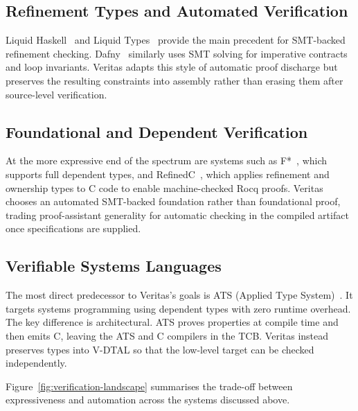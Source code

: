 \subsection{Refinement Types and Automated Verification}
Liquid Haskell~\cite{Vazou2014Refinement} and Liquid Types~\cite{Rondon2008Liquid} provide the main precedent for SMT-backed refinement checking. Dafny~\cite{Leino2010Dafny} similarly uses SMT solving for imperative contracts and loop invariants. Veritas adapts this style of automatic proof discharge but preserves the resulting constraints into assembly rather than erasing them after source-level verification.

\subsection{Foundational and Dependent Verification}
At the more expressive end of the spectrum are systems such as F*~\cite{Swamy2016Dependent}, which supports full dependent types, and RefinedC~\cite{Sammler2021RefinedC}, which applies refinement and ownership types to C code to enable machine-checked Rocq proofs. Veritas chooses an automated SMT-backed foundation rather than foundational proof, trading proof-assistant generality for automatic checking in the compiled artifact once specifications are supplied.

\subsection{Verifiable Systems Languages}
The most direct predecessor to Veritas's goals is ATS (Applied Type System)~\cite{Xi2003Applied}. It targets systems programming using dependent types with zero runtime overhead. The key difference is architectural. ATS proves properties at compile time and then emits C, leaving the ATS and C compilers in the TCB. Veritas instead preserves types into V-DTAL so that the low-level target can be checked independently.

Figure~\ref{fig:verification-landscape} summarises the trade-off between expressiveness and automation across the systems discussed above.

